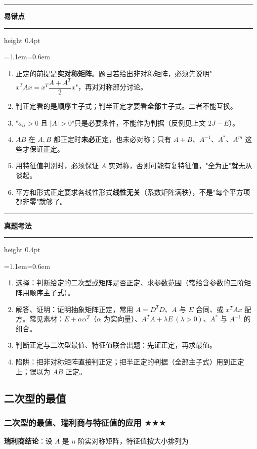 \documentclass[11pt,openany,UTF8]{ctexbook}
\newcommand{\callouthead}[2]{%
  \par\addvspace{7pt}\noindent
  {\color{#1}\rule[-0.15em]{3pt}{1.05em}}\hspace{0.5em}%
  {\bfseries\color{#1}#2}\par\nobreak\vspace{-0.35em}%
  {\color{rulesep}\hrule height 0.4pt}\nobreak\vspace{0.45em}%
  \begingroup\small\setlength{\parindent}{0pt}%
  \leftskip=1.1em\rightskip=0.6em\noindent\ignorespaces}
\newcommand{\calloutend}{\par\endgroup\addvspace{7pt}}
\newenvironment{callwarn}[1]{\callouthead{warnbar}{#1}}{\calloutend}
\newenvironment{callexam}[1]{\callouthead{exambar}{#1}}{\calloutend}
\begin{document}
\begin{callwarn}{易错点}
\begin{enumerate}
\item 正定的前提是\textbf{实对称矩阵}。题目若给出非对称矩阵，必须先说明"$x^TAx=x^T\dfrac{A+A^T}{2}x$"，再对对称部分讨论。
\item 判正定看的是\textbf{顺序}主子式；判半正定才要看\textbf{全部}主子式。二者不能互换。
\item "$a_{ii}>0$ 且 $\vert A\vert>0$"只是必要条件，不能作为判据（反例见上文 $2J-E$）。
\item $AB$ 在 $A,B$ 都正定时\textbf{未必}正定，也未必对称；只有 $A+B$、$A^{-1}$、$A^*$、$A^m$ 这些才保证正定。
\item 用特征值判别时，必须保证 $A$ 实对称，否则可能有复特征值，"全为正"就无从谈起。
\item 平方和形式正定要求各线性形式\textbf{线性无关}（系数矩阵满秩），不是"每个平方项都非零"就够了。
\end{enumerate}
\end{callwarn}

\begin{callexam}{真题考法}
\begin{enumerate}
\item 选择：判断给定的二次型或矩阵是否正定、求参数范围（常给含参数的三阶矩阵用顺序主子式）。
\item 解答、证明：证明抽象矩阵正定，常用 $A=D^TD$、$A$ 与 $E$ 合同、或 $x^TAx$ 配方。常见素材：$E+\alpha\alpha^T$（$\alpha$ 为实向量）、$A^TA+\lambda E\ (\lambda>0)$、$A^*$ 与 $A^{-1}$ 的组合。
\item 判断正定与二次型最值、特征值联合出题：先证正定，再求最值。
\item 陷阱：把非对称矩阵直接判正定；把半正定的判据（全部主子式）用到正定上；误以为 $AB$ 正定。
\end{enumerate}
\end{callexam}

\subsection{二次型的最值}

\subsubsection{二次型的最值、瑞利商与特征值的应用 $\bigstar$$\bigstar$$\bigstar$}

\textbf{瑞利商结论}：设 $A$ 是 $n$ 阶实对称矩阵，特征值按大小排列为
\end{document}
